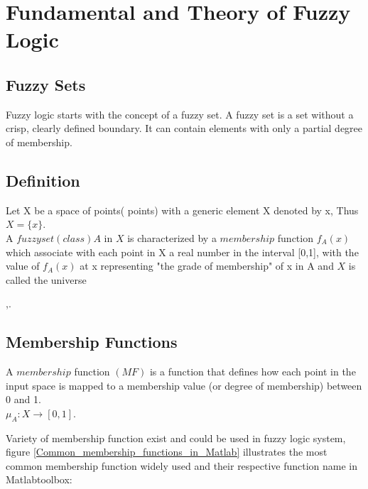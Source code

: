 \documentclass{article}
\begin{document}
\section{Fundamental and Theory of Fuzzy Logic}\label{Fundamental_and_Theory_of_Fuzzy_Logic}
\subsection{Fuzzy Sets}
Fuzzy logic starts with the concept of a fuzzy set. A fuzzy set is a set without a crisp, clearly defined boundary. It can contain elements with only a partial degree of membership.\cite{Fuzzy_Logic_Toolbox_For_Use_with_MATLAB}



\subsection{Definition}
Let X be a space of points( points) with a generic element X denoted by x, Thus $\mathit{X=\{x\}}$.
\\
A $\mathit{fuzzy set(class)} A $  in $\mathit{X}$ is characterized by a $\mathit{membership}$ function $f_{A}(x)$
which associate with each point in X a real number in the interval [0,1], with the value of $f_{A}(x)$
at x representing "the grade of membership" of x in A and 
$\mathit{X}$ is called the universe

\cite{Zadeh1965},\cite{Introduction_to_Fuzzy_Logic_using_MATLAB}.


\subsection{Membership Functions}
A  $\mathit{membership}$ function $\mathit{(MF)}$ is a function that defines how each point in the input
space is mapped to a membership value (or degree of membership) between 0 and 1.\\
$\mu_{A}: X \rightarrow [0, 1]$.

Variety of membership function exist and could be used in fuzzy logic system, figure \ref{Common_membership_functions_in_Matlab} illustrates the most common membership function widely used and their respective function name in Matlab\texttrademark toolbox:
\end{document}
